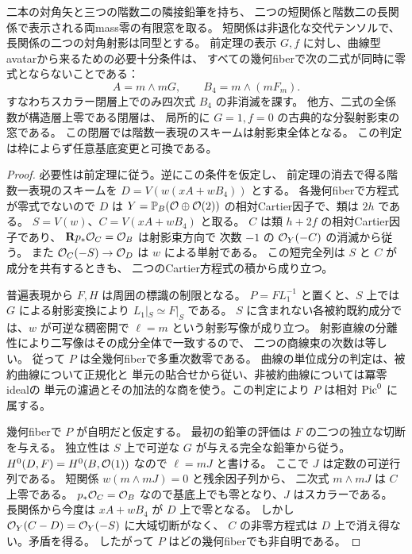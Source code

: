 \begin{corollary}[両mass零の幾何的像の方程式判定]
\label{cor:qa-avatar-deep-relative-image}
二本の対角矢と三つの階数二の隣接鉛筆を持ち、
二つの短関係と階数二の長関係で表示される両mass零の有限窓を取る。
短関係は非退化な交代テンソルで、長関係の二つの対角射影は同型とする。
前定理の表示 $G,f$ に対し、曲線型avatarから来るための必要十分条件は、
すべての幾何fiberで次の二式が同時に零式とならないことである：
\[
 A=m\wedge mG,\qquad B_4=m\wedge(mF_m).
\]
すなわちスカラー閉層上でのみ四次式 $B_4$ の非消滅を課す。
他方、二式の全係数が構造層上零である閉層は、
局所的に $G=1,f=0$ の古典的な分裂射影束の窓である。
この閉層では階数一表現のスキームは射影束全体となる。
この判定は枠によらず任意基底変更と可換である。
\end{corollary}
\begin{proof}
必要性は前定理に従う。逆にこの条件を仮定し、
前定理の消去で得る階数一表現のスキームを
$D=V(w(xA+wB_4))$ とする。
各幾何fiberで方程式が零式でないので $D$ は
$Y=\mathbb P_B(\mathcal O\oplus\mathcal O(2))$ の相対Cartier因子で、類は $2h$ である。
$S=V(w)$、$C=V(xA+wB_4)$ と取る。
$C$ は類 $h+2f$ の相対Cartier因子であり、
$\mathbf Rp_*\mathcal O_C=\mathcal O_B$ は射影束方向で
次数 $-1$ の $\mathcal O_Y(-C)$ の消滅から従う。
また $\mathcal O_C(-S)\to\mathcal O_D$ は $w$ による単射である。
この短完全列は $S$ と $C$ が成分を共有するときも、
二つのCartier方程式の積から成り立つ。

普遍表現から $F,H$ は周囲の標識の制限となる。
$P=F L_1^{-1}$ と置くと、$S$ 上では $G$ による射影変換により
$L_1|_S\simeq F|_S$ である。
$S$ に含まれない各被約既約成分では、$w$ が可逆な稠密開で
$\ell=m$ という射影写像が成り立つ。
射影直線の分離性により二写像はその成分全体で一致するので、
二つの商線束の次数は等しい。
従って $P$ は全幾何fiberで多重次数零である。
曲線の単位成分の判定は、被約曲線について正規化と
単元の貼合せから従い、非被約曲線については冪零idealの
単元の濾過とその加法的な商を使う。この判定により $P$
は相対 $\operatorname{Pic}^0$ に属する。

幾何fiberで $P$ が自明だと仮定する。
最初の鉛筆の評価は $F$ の二つの独立な切断を与える。
独立性は $S$ 上で可逆な $G$ が与える完全な鉛筆から従う。
$H^0(D,F)=H^0(B,\mathcal O(1))$ なので $\ell=mJ$ と書ける。
ここで $J$ は定数の可逆行列である。
短関係 $w(m\wedge mJ)=0$ と残余因子列から、
二次式 $m\wedge mJ$ は $C$ 上零である。
$p_*\mathcal O_C=\mathcal O_B$ なので基底上でも零となり、$J$ はスカラーである。
長関係から今度は $xA+wB_4$ が $D$ 上で零となる。
しかし $\mathcal O_Y(C-D)=\mathcal O_Y(-S)$ に大域切断がなく、
$C$ の非零方程式は $D$ 上で消え得ない。矛盾を得る。
したがって $P$ はどの幾何fiberでも非自明である。


\end{proof}
